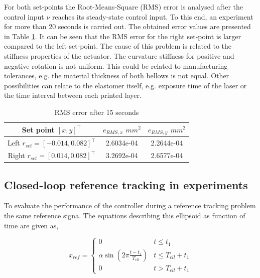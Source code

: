 For both set-points the Root-Means-Square (RMS) error is analysed after the control input $\nu$ reaches its steady-state control input. To this end, an experiment for more than 20 seconds is carried out. The obtained error values are presented in Table \ref{tab:RMSerrors}. It can be seen that the RMS error for the right set-point is larger compared to the left set-point. The cause of this problem is related to the stiffness properties of the actuator. The curvature stiffness for positive and negative rotation is not uniform. This could be related to manufacturing tolerances, e.g. the material thickness of both bellows is not equal. Other possibilities can relate to the elastomer itself, e.g. exposure time of the laser or the time interval between each printed layer. 



\begin{table}[H]
    \centering
    \caption{RMS error after 15 seconds}
    \begin{tabular}{|c|c|c|} \hline
     Set point $[x,y]^\top$    & $e_{RMS,x}$ $mm^2$  &  $e_{RMS,y}$ $mm^2$  \\ \hline
    Left $r_{set}= [-0.014,0.082]^\top$     & 2.6034e-04  & 2.2644e-04 \\ \hline
    Right $r_{set}= [0.014,0.082]^\top$  &  3.2692e-04 &   2.6577e-04\\ \hline
    \end{tabular}
    \label{tab:RMSerrors}
\end{table}



\subsection{Closed-loop reference tracking in experiments}

To evaluate the performance of the controller during a reference tracking problem the same reference signa. The equations describing this ellipsoid as function of time are given as,

\begin{equation}
    x_{ref} = \begin{cases} 
      0 &  t \leq t_1 \\
     \alpha \sin(2\pi \frac{t - t_1}{T_{ell}}) & t \leq T_{ell} + t_1 \\
     0 & t > T_{ell} + t_1
   \end{cases} 
\end{equation}

